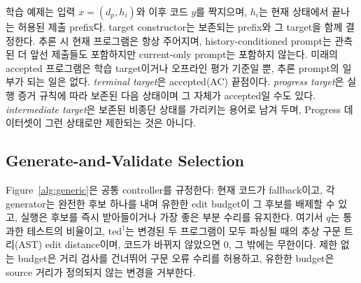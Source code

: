 \documentclass[10pt,conference]{IEEEtran}
\begin{document}
학습 예제는 입력 \(x=(d_p,h_i)\)와 이후 코드 \(y\)를 짝지으며, \(h_i\)는 현재 상태에서 끝나는 허용된 제출 prefix다. target constructor는 보존되는 prefix와 그 target을 함께 결정한다. 추론 시 현재 프로그램은 항상 주어지며, history-conditioned prompt는 관측된 더 앞선 제출들도 포함하지만 current-only prompt는 포함하지 않는다. 미래의 accepted 프로그램은 학습 target이거나 오프라인 평가 기준일 뿐, 추론 prompt의 일부가 되는 일은 없다. \emph{terminal target}은 accepted(AC) 끝점이다. \emph{progress target}은 실행 증거 규칙에 따라 보존된 다음 상태이며 그 자체가 accepted일 수도 있다. \emph{intermediate target}은 보존된 비종단 상태를 가리키는 용어로 남겨 두며, Progress 데이터셋이 그런 상태로만 제한되는 것은 아니다.

\subsection{Generate-and-Validate Selection}

Figure~\ref{alg:generic}은 공통 controller를 규정한다: 현재 코드가 fallback이고, 각 generator는 완전한 후보 하나를 내며 유한한 edit budget이 그 후보를 배제할 수 있고, 실행은 후보를 즉시 받아들이거나 가장 좋은 부분 수리를 유지한다. 여기서 \(q\)는 통과한 테스트의 비율이고, \(\mathrm{ted}^{\dagger}\)는 변경된 두 프로그램이 모두 파싱될 때의 추상 구문 트리(AST) edit distance이며, 코드가 바뀌지 않았으면 0, 그 밖에는 무한이다. 제한 없는 budget은 거리 검사를 건너뛰어 구문 오류 수리를 허용하고, 유한한 budget은 source 거리가 정의되지 않는 변경을 거부한다.
\end{document}
